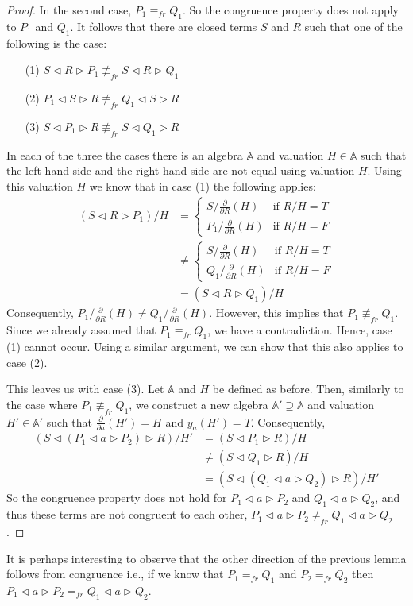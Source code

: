\documentclass[a4paper,twoside,openright]{report}
\newcommand{\dd}[1]{\frac{\partial}{\partial #1}}
\newcommand{\lef}{\ensuremath{\triangleleft}}
\newcommand{\rig}{\ensuremath{\triangleright}}
\begin{document}
\begin{proof}
In the second case, $P_1\equiv_{fr}Q_1$. So the congruence property does not apply to $P_1$ and $Q_1$. It follows that there are closed terms $S$ and $R$ such that one of the following is the case:
\begin{itemize}
\item[(1)] $S\lef R\rig P_1\not\equiv_{fr} S\lef R\rig Q_1$
\item[(2)] $P_1\lef S\rig R\not\equiv_{fr} Q_1\lef S\rig R$
\item[(3)] $S\lef P_1\rig R\not\equiv_{fr} S\lef Q_1\rig R$
\end{itemize}
In each of the three the cases there is an algebra $\mathbb{A}$ and valuation $H\in\mathbb{A}$ such that the left-hand side and the right-hand side are not equal using  valuation $H$. Using this valuation $H$ we know that in case (1) the following applies:
\begin{align*}
(S\lef R\rig P_1)/H
&=\begin{cases}
S/\dd R(H) & \text{if $R/H=T$}\\
P_1/\dd R(H) & \text{if $R/H=F$}
\end{cases}\\
&\ne\begin{cases}
S/\dd R(H) & \text{if $R/H=T$}\\
Q_1/\dd R(H) & \text{if $R/H=F$}
\end{cases}\\
&=(S\lef R\rig Q_1)/H
\end{align*}
Consequently, $P_1/\dd R(H)\ne Q_1/\dd R(H)$. However, this implies that $P_1\not\equiv_{fr} Q_1$. Since we already assumed that $P_1\equiv_{fr} Q_1$, we have a contradiction. Hence, case (1) cannot occur. Using a similar argument, we can show that this also applies to case (2).

This leaves us with case (3). Let $\mathbb{A}$ and $H$ be defined as before. Then, similarly to the case where $P_1\not\equiv_{fr}Q_1$, we construct a new algebra $\mathbb{A'}\supseteq\mathbb{A}$ and valuation $H'\in\mathbb{A'}$ such that $\dd a(H')=H$ and $y_a(H')=T$. Consequently,
\begin{align*}
(S\lef(P_1\lef a\rig P_2)\rig R)/H'
&=(S\lef P_1\rig R)/H\\
&\ne(S\lef Q_1\rig R)/H\\
&=(S\lef(Q_1\lef a\rig Q_2)\rig R)/H'
\end{align*}
So the congruence property does not hold for $P_1\lef a\rig P_2$ and $Q_1\lef a\rig Q_2$, and thus these terms are not congruent to each other, $P_1\lef a\rig P_2\ne_{fr}Q_1\lef a\rig Q_2$.
\end{proof}
It is perhaps interesting to observe that the other direction of the previous lemma follows from congruence i.e., if we know that $P_1=_{fr}Q_1$ and $P_2=_{fr}Q_2$ then $P_1\lef a\rig P_2=_{fr}Q_1\lef a\rig Q_2$.
\end{document}
